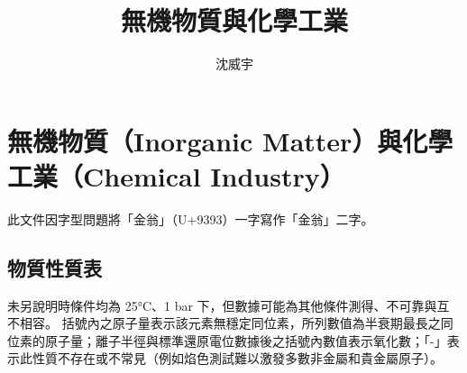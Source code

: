 \documentclass[a4paper,12pt]{report}
\begin{document}
\title{無機物質與化學工業}
\author{沈威宇}
\date{\temtoday}
\titletocdoc
\chapter{無機物質（Inorganic Matter）與化學工業（Chemical Industry）}
此文件因字型問題將「金翁」（U+9393）一字寫作「金翁」二字。
\section{物質性質表}
未另說明時條件均為 25°C、1 bar 下，但數據可能為其他條件測得、不可靠與互不相容。
括號內之原子量表示該元素無穩定同位素，所列數值為半衰期最長之同位素的原子量；離子半徑與標準還原電位數據後之括號內數值表示氧化數；「-」表示此性質不存在或不常見（例如焰色測試難以激發多數非金屬和貴金屬原子）。
\end{document}
